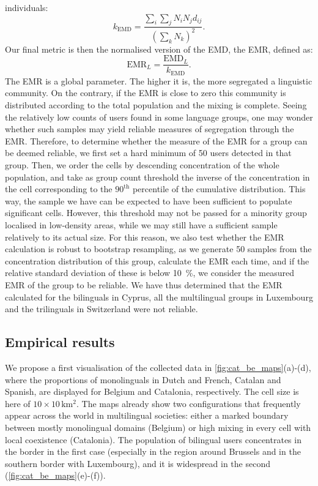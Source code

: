 \documentclass[../thesis.tex]{subfiles}
\begin{document}
individuals:
\begin{equation}
  k_\text{EMD} = \frac{\sum_i \sum_j N_i N_j d_{ij} }{\left( \sum_k N_k \right)^2}.
\end{equation}
Our final metric is then the normalised version of the \ac{EMD}, the \acf{EMR}, defined
as:
\begin{equation}
  \label{eq:emr_def}
  \text{EMR}_L = \frac{\text{EMD}_L}{k_\text{EMD}} .
\end{equation}
The \ac{EMR} is a global parameter. The higher it is, the more segregated a linguistic
community. On the contrary, if the \ac{EMR} is close to zero this community is
distributed according to the total population and the mixing is complete. Seeing the
relatively low counts of users found in some language groups, one may wonder whether
such samples may yield reliable measures of segregation through the \ac{EMR}. Therefore,
to determine whether the measure of the \ac{EMR} for a group can be deemed reliable, we
first set a hard minimum of 50 users detected in that group. Then, we order the cells by
descending concentration of the whole population, and take as group count threshold the
inverse of the concentration in the cell corresponding to the $90^\textrm{th}$
percentile of the cumulative distribution. This way, the sample we have can be expected
to have been sufficient to populate significant cells. However, this threshold may not
be passed for a minority group localised in low-density areas, while we may still have a
sufficient sample relatively to its actual size. For this reason, we also test whether
the \ac{EMR} calculation is robust to bootstrap resampling, as we generate 50 samples
from the concentration distribution of this group, calculate the \ac{EMR} each time, and
if the relative standard deviation of these is below \SI{10}{\percent}, we consider the
measured \ac{EMR} of the group to be reliable. We have thus determined that the \ac{EMR}
calculated for the bilinguals in Cyprus, all the multilingual groups in Luxembourg and
the trilinguals in Switzerland were not reliable.


\subsection{Empirical results}
We propose a first visualisation of the collected data in \cref{fig:cat_be_maps}(a)-(d),
where the proportions of monolinguals in Dutch and French, Catalan and Spanish, are
displayed for Belgium and Catalonia, respectively. The cell size is here of $10 \times
10 \, \si{\kilo \meter \squared}$. The maps already show two configurations that
frequently appear across the world in multilingual societies: either a marked boundary
between mostly monolingual domains (Belgium) or high mixing in every cell with local
coexistence (Catalonia). The population of bilingual users concentrates in the border in
the first case (especially in the region around Brussels and in the southern border with
Luxembourg), and it is widespread in the second (\cref{fig:cat_be_maps}(e)-(f)).
\end{document}
